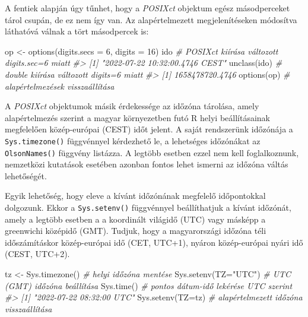 \documentclass[
]{book}
\newenvironment{Shaded}{\begin{snugshade}}{\end{snugshade}}
\newcommand{\AttributeTok}[1]{\textcolor[rgb]{0.77,0.63,0.00}{#1}}
\newcommand{\CommentTok}[1]{\textcolor[rgb]{0.56,0.35,0.01}{\textit{#1}}}
\newcommand{\DecValTok}[1]{\textcolor[rgb]{0.00,0.00,0.81}{#1}}
\newcommand{\FunctionTok}[1]{\textcolor[rgb]{0.00,0.00,0.00}{#1}}
\newcommand{\NormalTok}[1]{#1}
\newcommand{\OtherTok}[1]{\textcolor[rgb]{0.56,0.35,0.01}{#1}}
\newcommand{\StringTok}[1]{\textcolor[rgb]{0.31,0.60,0.02}{#1}}
\begin{document}
A fentiek alapján úgy tűnhet, hogy a \emph{POSIXct} objektum egész másodperceket tárol csupán, de ez nem így van. Az alapértelmezett megjelenítéseken módosítva láthatóvá válnak a tört másodpercek is:

\begin{Shaded}
\begin{Highlighting}[]
\NormalTok{op }\OtherTok{\textless{}{-}} \FunctionTok{options}\NormalTok{(}\AttributeTok{digits.secs =} \DecValTok{6}\NormalTok{, }\AttributeTok{digits =} \DecValTok{16}\NormalTok{)}
\NormalTok{ido             }\CommentTok{\# POSIXct kiírása változott digits.sec=6 miatt}
\CommentTok{\#\textgreater{} [1] "2022{-}07{-}22 10:32:00.4746 CEST"}
\FunctionTok{unclass}\NormalTok{(ido)    }\CommentTok{\# double kiírása változott digits=6 miatt}
\CommentTok{\#\textgreater{} [1] 1658478720.4746}
\FunctionTok{options}\NormalTok{(op)     }\CommentTok{\# alapértelmezések visszaállítása}
\end{Highlighting}
\end{Shaded}

A \emph{POSIXct} objektumok másik érdekessége az időzóna tárolása, amely alapértelmezés szerint a magyar környezetben futó R helyi beállításainak megfelelően közép-európai (CEST) időt jelent. A saját rendszerünk időzónája a \texttt{Sys.timezone()} függvénnyel kérdezhető le, a lehetséges időzónákat az \texttt{OlsonNames()} függvény listázza. A legtöbb esetben ezzel nem kell foglalkoznunk, nemzetközi kutatások esetében azonban fontos lehet ismerni az időzóna váltás lehetőségét.

Egyik lehetőség, hogy eleve a kívánt időzónának megfelelő időpontokkal dolgozunk. Ekkor a \texttt{Sys.setenv()} függvénnyel beállíthatjuk a kívánt időzónát, amely a legtöbb esetben a a koordinált világidő (UTC) vagy másképp a greenwichi középidő (GMT). Tudjuk, hogy a magyarországi időzóna téli időszámításkor közép-európai idő (CET, UTC+1), nyáron közép-európai nyári idő (CEST, UTC+2).

\begin{Shaded}
\begin{Highlighting}[]
\NormalTok{tz }\OtherTok{\textless{}{-}} \FunctionTok{Sys.timezone}\NormalTok{()  }\CommentTok{\# helyi időzóna mentése}
\FunctionTok{Sys.setenv}\NormalTok{(}\AttributeTok{TZ=}\StringTok{"UTC"}\NormalTok{)  }\CommentTok{\# UTC (GMT) időzóna beállítása}
\FunctionTok{Sys.time}\NormalTok{()            }\CommentTok{\# pontos dátum{-}idő lekérése UTC szerint}
\CommentTok{\#\textgreater{} [1] "2022{-}07{-}22 08:32:00 UTC"}
\FunctionTok{Sys.setenv}\NormalTok{(}\AttributeTok{TZ=}\NormalTok{tz)     }\CommentTok{\# alapértelmezett időzóna visszaállítása}
\end{Highlighting}
\end{Shaded}
\end{document}
